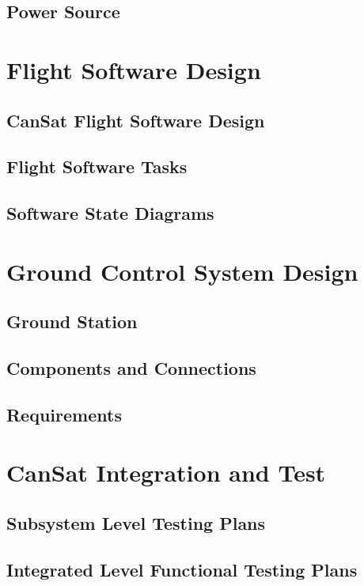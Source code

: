 \documentclass[10pt, a4paper]{article}
\begin{document}
\subsection{Power Source}

\newpage

\section{Flight Software Design}
\subsection{CanSat Flight Software Design}
\subsection{Flight Software Tasks}
\subsection{Software State Diagrams}

\newpage

\section{Ground Control System Design}
\subsection{Ground Station}
\subsection{Components and Connections}
\subsection{Requirements}

\newpage

\section{CanSat Integration and Test}
\subsection{Subsystem Level Testing Plans}
\subsection{Integrated Level Functional Testing Plans}
\end{document}
